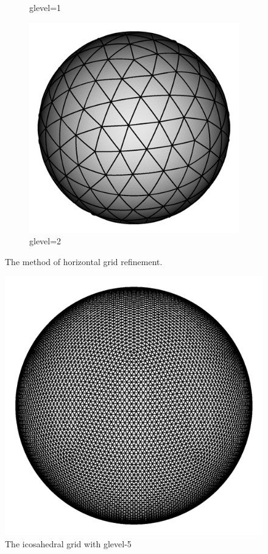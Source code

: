 \begin{figure}[tb]
\begin{subfigure}{.32\textwidth}
\caption{glevel=1}\label{f:glevel_1}
\end{subfigure}
\begin{subfigure}{.32\textwidth}
\centering
 \includegraphics[width=\textwidth]{figs/Tomita_etal_2008_SIAM-7-2.png}
\caption{glevel=2}\label{f:glevel_2}
\end{subfigure}
\caption{The method of horizontal grid refinement.}\label{f:horiz_grid_refinement}%
\end{figure}

\begin{figure}[tb]
\centering
 \includegraphics[scale=.25]{figs/Tomita1-26-0.png}
 \caption{The icosahedral grid with glevel-5}
 \label{f:glevel_5}
\end{figure}


